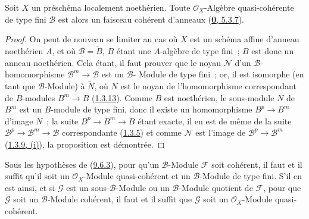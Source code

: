 \begin{proposition}[9.6.3]
\label{I.9.6.3-fr}
Soit $X$ un préschéma localement noethérien. Toute
$\mathscr{O}_X$-Algèbre quasi-cohérente de type fini $\mathscr{B}$ est
alors un faisceau cohérent d'anneaux
(\hyperref[0.5.3.7-fr]{\textbf{0}, 5.3.7}).
\end{proposition}

\begin{proof}
On peut de nouveau se limiter au cas où $X$ est un schéma affine d'anneau
noethérien $A$, et où $\mathscr{B}=\widetilde{B}$, $B$ étant une
$A$-algèbre de type fini~; $B$ est donc un anneau noethérien. Cela étant, il
faut prouver que le noyau $\mathscr{N}$ d'un
$\mathscr{B}$-homomorphisme $\mathscr{B}^m\to\mathscr{B}$ est un
$\mathscr{B}$-
Module de type fini~; or, il est isomorphe (en tant que
$\mathscr{B}$-Module) à $\widetilde{N}$, où $N$ est le noyau de
l'homomorphisme correspondant de $B$-modules $B^m\to B$
(\hyperref[I.1.3.13-fr]{1.3.13}). Comme $B$ est noethérien, le sous-module
$N$ de $B^m$ est un $B$-module de type fini, donc il existe un homomorphisme
$B^p\to B^m$ d'image $N$~; la suite $B^p\to B^m\to B$ étant exacte, il
en est de même de la suite
$\mathscr{B}^p\to\mathscr{B}^m\to\mathscr{B}$ correspondante
(\hyperref[I.1.3.5-fr]{1.3.5}) et comme $\mathscr{N}$ est l'image de
$\mathscr{B}^p\to\mathscr{B}^m$
(\hyperref[I.1.3.9-fr]{1.3.9, (i)}), la proposition est démontrée.
\end{proof}

\begin{corollary}[9.6.4]
\label{I.9.6.4-fr}
Sous les hypothèses de \textup{(\hyperref[I.9.6.3-fr]{9.6.3})}, pour qu'un
$\mathscr{B}$-Module $\mathscr{F}$ soit cohérent, il faut et il suffit
qu'il soit un $\mathscr{O}_X$-Module quasi-cohérent et un
$\mathscr{B}$-Module de type fini. S'il en est ainsi, et si $\mathscr{G}$
est un sous-$\mathscr{B}$-Module ou un $\mathscr{B}$-Module quotient de
$\mathscr{F}$, pour que $\mathscr{G}$ soit un $\mathscr{B}$-Module
cohérent, il faut et il suffit que $\mathscr{G}$ soit un
$\mathscr{O}_X$-Module quasi-cohérent.
\end{corollary}


